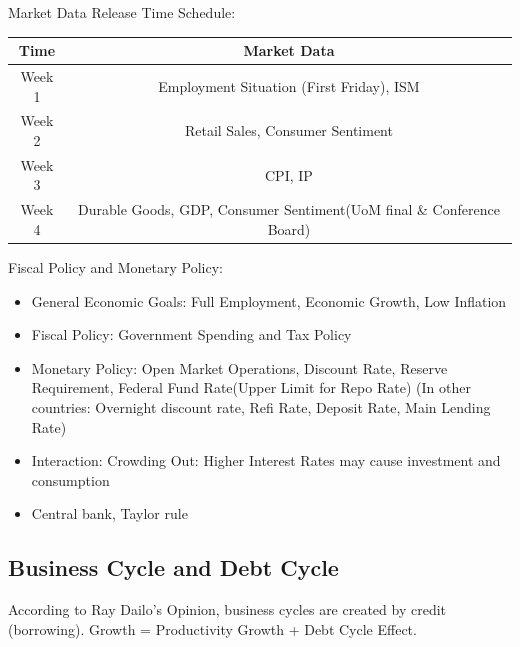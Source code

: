 \documentclass[11pt, openany]{book}              %
\begin{document}
Market Data Release Time Schedule:

\begin{center}
 \begin{tabular}{||c c||} 
 \hline
 Time & Market Data \\ [0.5ex] 
 \hline
 Week 1 & Employment Situation (First Friday), ISM \\ 
 Week 2 & Retail Sales, Consumer Sentiment \\ 
 Week 3 & CPI, IP \\ 
 Week 4 & Durable Goods, GDP, Consumer Sentiment(UoM final \& Conference Board) \\ 
 \hline
\end{tabular}
\end{center}

Fiscal Policy and Monetary Policy:

\begin{itemize}
	\item General Economic Goals: Full Employment, Economic Growth, Low Inflation
	\item Fiscal Policy: Government Spending and Tax Policy
    \item Monetary Policy: Open Market Operations, Discount Rate, Reserve Requirement, Federal Fund Rate(Upper Limit for Repo Rate) (In other countries: Overnight discount rate, Refi Rate, Deposit Rate, Main Lending Rate) 
    \item Interaction: Crowding Out: Higher Interest Rates may cause investment and consumption 
    \item Central bank, Taylor rule
\end{itemize}

\subsection{Business Cycle and Debt Cycle}

According to Ray Dailo's Opinion, business cycles are created by credit (borrowing). Growth = Productivity Growth + Debt Cycle Effect.  
\end{document}
